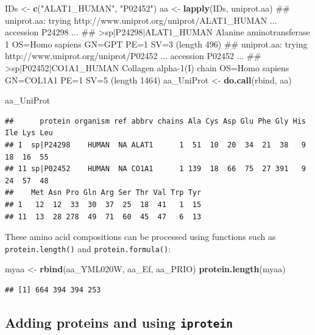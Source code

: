 \documentclass[]{tufte-handout}
\newenvironment{Shaded}{}{}
\newcommand{\KeywordTok}[1]{\textcolor[rgb]{0.00,0.44,0.13}{\textbf{#1}}}
\newcommand{\StringTok}[1]{\textcolor[rgb]{0.25,0.44,0.63}{#1}}
\newcommand{\NormalTok}[1]{#1}
\begin{document}
\begin{Shaded}
\begin{Highlighting}[]
\NormalTok{IDs <-}\StringTok{ }\KeywordTok{c}\NormalTok{(}\StringTok{"ALAT1_HUMAN"}\NormalTok{, }\StringTok{"P02452"}\NormalTok{)}
\NormalTok{aa <-}\StringTok{ }\KeywordTok{lapply}\NormalTok{(IDs, uniprot.aa)}
\NormalTok{## uniprot.aa: trying http://www.uniprot.org/uniprot/ALAT1_HUMAN ... accession P24298 ...}
\NormalTok{## >sp|P24298|ALAT1_HUMAN Alanine aminotransferase 1 OS=Homo sapiens GN=GPT PE=1 SV=3 (length 496)}
\NormalTok{## uniprot.aa: trying http://www.uniprot.org/uniprot/P02452 ... accession P02452 ...}
\NormalTok{## >sp|P02452|CO1A1_HUMAN Collagen alpha-1(I) chain OS=Homo sapiens GN=COL1A1 PE=1 SV=5 (length 1464)}
\NormalTok{aa_UniProt <-}\StringTok{ }\KeywordTok{do.call}\NormalTok{(rbind, aa)}
\end{Highlighting}
\end{Shaded}

\begin{Shaded}
\begin{Highlighting}[]
\NormalTok{aa_UniProt}
\end{Highlighting}
\end{Shaded}

\begin{verbatim}
##      protein organism ref abbrv chains Ala Cys Asp Glu Phe Gly His Ile Lys Leu
## 1  sp|P24298    HUMAN  NA ALAT1      1  51  10  20  34  21  38   9  18  16  55
## 11 sp|P02452    HUMAN  NA CO1A1      1 139  18  66  75  27 391   9  24  57  48
##    Met Asn Pro Gln Arg Ser Thr Val Trp Tyr
## 1   12  12  33  30  37  25  18  41   1  15
## 11  13  28 278  49  71  60  45  47   6  13
\end{verbatim}

These amino acid compositions can be processed using functions such as
{\texttt{protein.length()}} and {\texttt{protein.formula()}}:

\begin{Shaded}
\begin{Highlighting}[]
\NormalTok{myaa <-}\StringTok{ }\KeywordTok{rbind}\NormalTok{(aa_YML020W, aa_Ef, aa_PRIO)}
\KeywordTok{protein.length}\NormalTok{(myaa)}
\end{Highlighting}
\end{Shaded}

\begin{verbatim}
## [1] 664 394 394 253
\end{verbatim}

\subsection{\texorpdfstring{Adding proteins and using
\texttt{iprotein}}{Adding proteins and using iprotein}}\label{adding-proteins-and-using-iprotein}
\end{document}
